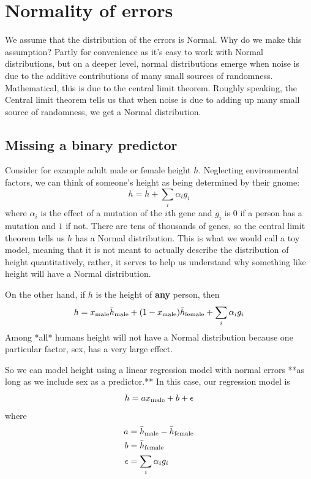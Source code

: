 \section{Normality of errors}



We assume that the distribution of the errors is Normal. Why do we make this assumption? Partly for convenience as it's easy to work with Normal distributions, but on a deeper level, normal distributions emerge when noise is due to the additive contributions of many small sources of randomness.  Mathematical, this is due to the central limit theorem. Roughly speaking, the Central limit theorem tells us that when noise is due to adding up many small source of randomness, we get a Normal distribution. 

\subsection{Missing a binary predictor}
Consider for example adult male or female height $h$. Neglecting environmental factors, we can think of someone's height as being determined by their gnome:
\begin{equation}
h = \bar{h} + \sum_i \alpha_i g_i 
\end{equation}
where $\alpha_i$ is the effect of a mutation of the $i$th gene and $g_i$ is $0$ if a person has a mutation and $1$ if not. There are tens of thousands of genes, so the central limit theorem tells us $h$ has a Normal distribution. This is what we would call a toy model, meaning that it is not meant to actually describe the distribution of height quantitatively, rather, it serves to help us understand why something like height will have a Normal distribution. 

On the other hand, if $h$ is the height of {\bf any} person, then 
\begin{equation}
h = x_{\rm male}\bar{h}_{\rm male} + (1-x_{\rm male})\bar{h}_{\rm female} + \sum_i \alpha_i g_i 
\end{equation}
Among *all* humans height will not have a Normal distribution because one particular factor, sex, has a very large effect. 

So we can model height using a linear regression model with normal errors **as long as we include sex as a predictor.** In this case, our regression model is 
\begin{equation}
h = ax_{\rm male} + b + \epsilon
\end{equation}
where
\begin{align}
a &= \bar{h}_{\rm male} - \bar{h}_{\rm female}\\
b &= \bar{h}_{\rm female}\\
\epsilon &= \sum_i \alpha_i g_i 
\end{align}


